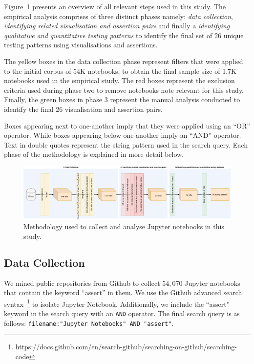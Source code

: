 \documentclass[conference]{IEEEtran}
\begin{document}
Figure~\ref{fig:method} presents an overview of all relevant steps used in this study. The empirical analysis comprises of three distinct phases namely: \textit{data collection}, \textit{identifying related visualisation and assertion pairs} and finally a \textit{identifying qualitative and quantitative testing patterns} to identify the final set of 26 unique testing patterns using visualisations and assertions.

The yellow boxes in the data collection phase represent filters that were applied to the initial corpus of 54K notebooks, to obtain the final sample size of 1.7K notebooks used in the empirical study. The red boxes represent the exclusion criteria used during phase two to remove notebooks note relevant for this study. Finally, the green boxes in phase 3 represent the manual analysis conducted to identify the final 26 visualisation and assertion pairs.

Boxes appearing next to one-another imply that they were applied using an ``OR'' operator. While boxes appearing below one-another imply an ``AND'' operator. Text in double quotes represent the string pattern used in the search query. Each phase of the methodology is explained in more detail below.

\begin{figure}
  \centering
  \includegraphics[width=\textwidth]{method.pdf}
  \caption{Methodology used to collect and analyse Jupyter notebooks
    in this study.}
  \label{fig:method}
\end{figure}

\subsection{Data Collection}\label{sec:data-collect}

We mined public repositories from Github to collect $54,070$ Jupyter notebooks that contain the keyword ``assert'' in them. We use the Github advanced search syntax~\footnote{https://docs.github.com/en/search-github/searching-on-github/searching-code} to isolate Jupyter Notebook. Additionally, we include the ``assert'' keyword in the search query with an \texttt{AND} operator. The final search query is as follows: \texttt{filename:"Jupyter Notebooks" AND "assert"}.
\end{document}
